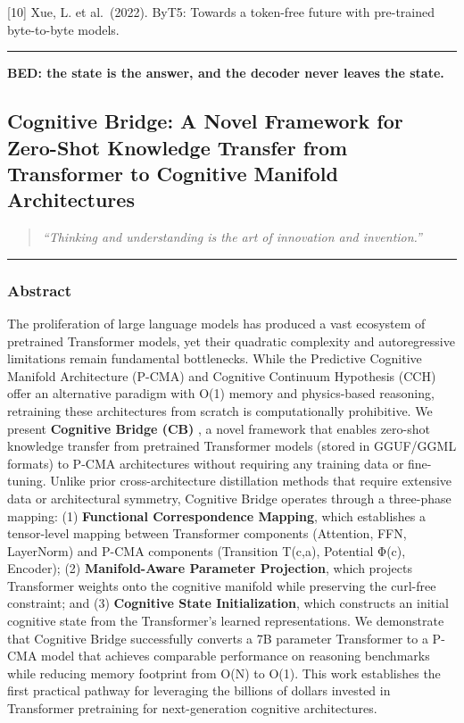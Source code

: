 \documentclass[
  11pt,
  a4paper,
]{article}
\begin{document}
{[}10{]} Xue, L. et al.~(2022). ByT5: Towards a token-free future with
pre-trained byte-to-byte models.

\begin{center}\rule{0.5\linewidth}{0.5pt}\end{center}

\textbf{BED: the state is the answer, and the decoder never leaves the
state.}

\newpage

\subsection{Cognitive Bridge: A Novel Framework for Zero-Shot Knowledge
Transfer from Transformer to Cognitive Manifold
Architectures}\label{cognitive-bridge-a-novel-framework-for-zero-shot-knowledge-transfer-from-transformer-to-cognitive-manifold-architectures}

\begin{quote}
\emph{``Thinking and understanding is the art of innovation and
invention.''}
\end{quote}

\begin{center}\rule{0.5\linewidth}{0.5pt}\end{center}

\subsubsection{Abstract}\label{abstract-2}

The proliferation of large language models has produced a vast ecosystem
of pretrained Transformer models, yet their quadratic complexity and
autoregressive limitations remain fundamental bottlenecks. While the
Predictive Cognitive Manifold Architecture (P-CMA) and Cognitive
Continuum Hypothesis (CCH) offer an alternative paradigm with O(1)
memory and physics-based reasoning, retraining these architectures from
scratch is computationally prohibitive. We present \textbf{Cognitive
Bridge (CB)} , a novel framework that enables zero-shot knowledge
transfer from pretrained Transformer models (stored in GGUF/GGML
formats) to P-CMA architectures without requiring any training data or
fine-tuning. Unlike prior cross-architecture distillation methods that
require extensive data or architectural symmetry, Cognitive Bridge
operates through a three-phase mapping: (1) \textbf{Functional
Correspondence Mapping}, which establishes a tensor-level mapping
between Transformer components (Attention, FFN, LayerNorm) and P-CMA
components (Transition T(c,a), Potential Φ(c), Encoder); (2)
\textbf{Manifold-Aware Parameter Projection}, which projects Transformer
weights onto the cognitive manifold while preserving the curl-free
constraint; and (3) \textbf{Cognitive State Initialization}, which
constructs an initial cognitive state from the Transformer's learned
representations. We demonstrate that Cognitive Bridge successfully
converts a 7B parameter Transformer to a P-CMA model that achieves
comparable performance on reasoning benchmarks while reducing memory
footprint from O(N) to O(1). This work establishes the first practical
pathway for leveraging the billions of dollars invested in Transformer
pretraining for next-generation cognitive architectures.
\end{document}
